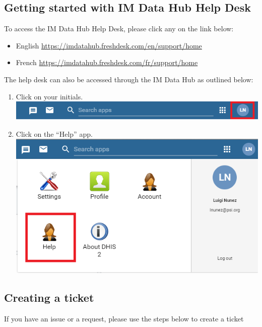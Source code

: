 \documentclass[]{book}
\providecommand{\tightlist}{%
  \setlength{\itemsep}{0pt}\setlength{\parskip}{0pt}}
\begin{document}
\hypertarget{getting-started-with-im-data-hub-help-desk}{%
\subsection{Getting started with IM Data Hub Help Desk}\label{getting-started-with-im-data-hub-help-desk}}

To access the IM Data Hub Help Desk, please click any on the link below:

\begin{itemize}
\tightlist
\item
  English \url{https://imdatahub.freshdesk.com/en/support/home}
\item
  French \url{https://imdatahub.freshdesk.com/fr/support/home}
\end{itemize}

The help desk can also be accessed through the IM Data Hub as outlined below:

\begin{enumerate}
\def\labelenumi{\arabic{enumi}.}
\item
  Click on your initials.
  \includegraphics{images/initials.png}
\item
  Click on the ``Help'' app.
  \includegraphics{images/help-menu.png}
\end{enumerate}

\hypertarget{creating-a-ticket}{%
\subsection{Creating a ticket}\label{creating-a-ticket}}

If you have an issue or a request, please use the steps below to create a ticket
\end{document}
